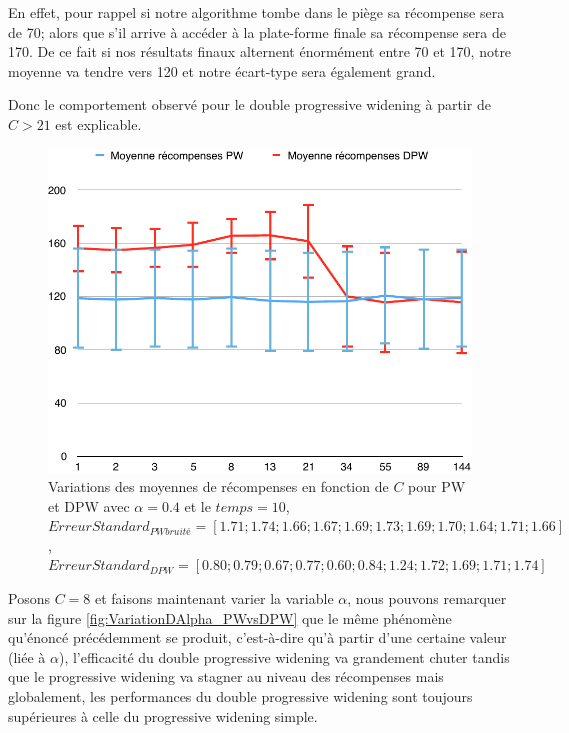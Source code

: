 \documentclass[pdftex,french, english]{article}	%
\begin{document}
    En effet, pour rappel si notre algorithme tombe dans le piège sa récompense sera de 70; alors que s'il arrive à accéder à la plate-forme finale sa récompense sera de 170. De ce fait si nos résultats finaux alternent énormément entre 70 et 170, notre moyenne va tendre vers 120 et notre écart-type sera également grand.
    
    Donc le comportement observé pour le double progressive widening à partir de $C>21$ est explicable.
    
    
    \begin{figure}[H]
		\centering
		\includegraphics[width=\textwidth]{VariationDeC_PWvsDPW.pdf}
		\caption{Variations des moyennes de récompenses en fonction de $C$ pour PW et DPW avec $\alpha = 0.4$ et le $temps = 10$, $ErreurStandard_{PWbruité} = [1.71 ; 1.74 ; 1.66 ; 1.67 ; 1.69 ; 1.73 ; 1.69 ; 1.70 ; 1.64 ; 1.71 ; 1.66]$, $ErreurStandard_{DPW} = [0.80 ; 0.79 ; 0.67 ; 0.77 ; 0.60 ; 0.84 ; 1.24 ; 1.72 ; 1.69 ; 1.71 ; 1.74]$}
		 \label{fig:VariationDeC_PWvsDPW}
	\end{figure}
    
    Posons $C=8$ et faisons maintenant varier la variable $\alpha$, nous pouvons remarquer sur la figure \ref{fig:VariationDAlpha_PWvsDPW} que le même phénomène qu'énoncé précédemment se produit, c'est-à-dire qu'à partir d'une certaine valeur (liée à $\alpha$), l’efficacité du double progressive widening va grandement chuter tandis que le progressive widening va stagner au niveau des récompenses mais globalement,
    les performances du double progressive widening sont toujours supérieures à celle du progressive widening simple.
    
\end{document}
